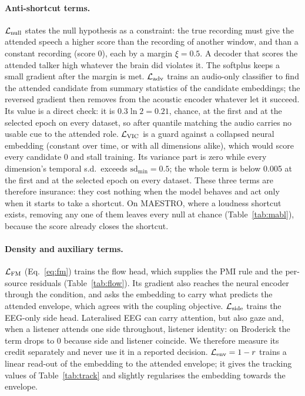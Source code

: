 \documentclass[twoside]{article}
\begin{document}
\paragraph{Anti-shortcut terms.} $\mathcal L_{\rm null}$ states the null hypothesis as a
constraint: the true recording must give the attended speech a higher score than the
recording of another window, and than a constant recording (score 0), each by a margin
$\xi=0.5$. A decoder that scores the attended talker high whatever the brain did violates
it. The softplus keeps a small gradient after the margin is met. $\mathcal L_{\rm adv}$
trains an audio-only classifier to find the attended candidate from summary statistics of
the candidate embeddings; the reversed gradient \citep{ganin2016domain} then removes from
the acoustic encoder whatever let it succeed. Its value is a direct check: it is
$0.3\ln 2=0.21$, chance, at the first and at the selected epoch on every dataset, so after
quantile matching the audio carries no usable cue to the attended role. $\mathcal L_{\rm VIC}$ is a
guard against a collapsed neural embedding (constant over time, or with all dimensions
alike), which would score every candidate 0 and stall training. Its variance part is zero while every
dimension's temporal s.d.\ exceeds $\mathrm{sd}_{\min}=0.5$; the whole term is below 0.005 at the first
and at the selected epoch on every dataset. These
three terms are therefore insurance: they cost nothing when the model behaves and act only
when it starts to take a shortcut. On MAESTRO, where a loudness shortcut exists, removing
any one of them leaves every null at chance (Table~\ref{tab:mabl}), because the score already closes
the shortcut.

\paragraph{Density and auxiliary terms.} $\mathcal L_{\rm FM}$ (Eq.~\ref{eq:fm}) trains the
flow head, which supplies the PMI rule and the per-source residuals (Table~\ref{tab:flow}).
Its gradient also reaches the neural encoder through the condition, and asks the embedding to
carry what predicts the attended envelope, which agrees with the coupling objective.
$\mathcal L_{\rm side}$ trains the EEG-only side head. Lateralised EEG can carry attention,
but also gaze and, when a listener attends one side throughout, listener identity: on
Broderick the term drops to 0 because side and listener coincide. We therefore measure its
credit separately and never use it in a reported decision. $\mathcal L_{\rm env}=1-r$
trains a linear read-out of the embedding to the attended envelope; it gives the tracking
values of Table~\ref{tab:track} and slightly regularises the embedding towards the envelope.
\end{document}
